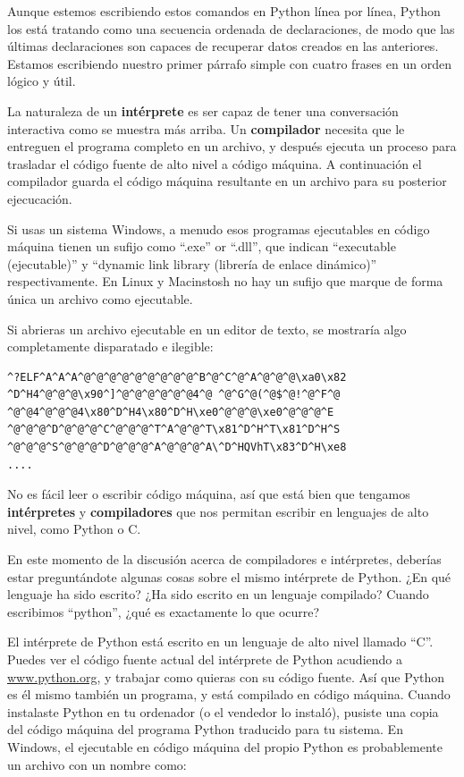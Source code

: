 Aunque estemos escribiendo estos comandos en Python línea por línea, Python
los está tratando como una secuencia ordenada de declaraciones, de modo
que las últimas declaraciones son capaces de recuperar datos creados en las
anteriores. Estamos escribiendo nuestro primer párrafo simple con cuatro frases
en un orden lógico y útil.

La naturaleza de un {\bf intérprete} es ser capaz de tener una conversación interactiva como se muestra más arriba. Un {\bf compilador} necesita que le entreguen el programa
completo en un archivo, y después
ejecuta un proceso para trasladar el código fuente de alto nivel a código máquina.
A continuación el compilador guarda el código máquina resultante en un archivo para su
posterior ejecucación. 

Si usas un sistema Windows, a menudo esos programas ejecutables en código máquina tienen un sufijo como ``.exe'' or ``.dll'', que indican ``executable (ejecutable)'' y ``dynamic
link library (librería de enlace dinámico)'' respectivamente. En Linux y Macinstosh
no hay un sufijo que marque de forma única un archivo como ejecutable.

Si abrieras un archivo ejecutable en un editor de texto, se mostraría algo
completamente disparatado e ilegible:

\beforeverb
\begin{verbatim}
^?ELF^A^A^A^@^@^@^@^@^@^@^@^@^B^@^C^@^A^@^@^@\xa0\x82
^D^H4^@^@^@\x90^]^@^@^@^@^@^@4^@ ^@^G^@(^@$^@!^@^F^@
^@^@4^@^@^@4\x80^D^H4\x80^D^H\xe0^@^@^@\xe0^@^@^@^E
^@^@^@^D^@^@^@^C^@^@^@^T^A^@^@^T\x81^D^H^T\x81^D^H^S
^@^@^@^S^@^@^@^D^@^@^@^A^@^@^@^A\^D^HQVhT\x83^D^H\xe8
....
\end{verbatim}
\afterverb
%
No es fácil leer o escribir código máquina, así que está bien que tengamos
{\bf intérpretes} y {\bf compiladores} que nos permitan escribir en lenguajes
de alto nivel, como Python o C.

En este momento de la discusión acerca de compiladores e intérpretes, deberías
estar preguntándote algunas cosas sobre el mismo intérprete de Python. ¿En qué
lenguaje ha sido escrito? ¿Ha sido escrito en un lenguaje compilado? Cuando escribimos ``python'', ¿qué es exactamente lo que ocurre?

El intérprete de Python está escrito en un lenguaje de alto nivel llamado ``C''.
Puedes ver el código fuente actual del intérprete de Python acudiendo a
\url{www.python.org}, y trabajar como quieras con su código fuente.
Así que Python es él mismo también un programa, y está compilado en código máquina.
Cuando instalaste Python en tu ordenador (o el vendedor lo instaló),
pusiste una copia del código máquina del programa Python traducido para tu sistema.
En Windows, el ejecutable en código máquina del propio Python es probablemente
un archivo con un nombre como:

